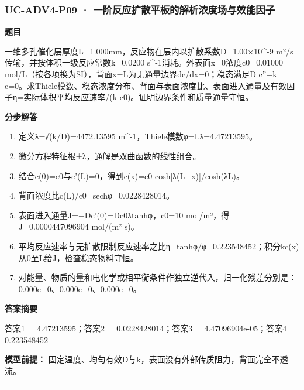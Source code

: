 \documentclass[UTF8,11pt,a4paper]{ctexart}
\begin{document}
\subsubsection*{UC-ADV4-P09 · 一阶反应扩散平板的解析浓度场与效能因子}
\noindent\textbf{题目}\par
一维多孔催化层厚度L=1.000mm，反应物在层内以扩散系数D=1.00×10\textasciicircum{}-9 m²/s传输，并按体积一级反应常数k=0.0200 s\textasciicircum{}-1消耗。外表面x=0浓度c0=0.01000 mol/L（按各项换为SI），背面x=L为无通量边界dc/dx=0；稳态满足D c''−k c=0。求Thiele模数、稳态浓度分布、背面与表面浓度比、表面进入通量及有效因子η=实际体积平均反应速率/(k c0)。证明边界条件和质量通量守恒。\par
\medskip\noindent\textbf{分步解答}
\begin{enumerate}
\item 定义λ=√(k/D)=4472.13595 m\textasciicircum{}-1，Thiele模数φ=Lλ=4.47213595。
\item 微分方程特征根±λ，通解是双曲函数的线性组合。
\item 结合c(0)=c0与c'(L)=0，得到c(x)=c0 cosh[λ(L−x)]/cosh(λL)。
\item 背面浓度比c(L)/c0=sechφ=0.0228428014。
\item 表面进入通量J=−Dc'(0)=Dc0λtanhφ，c0=10 mol/m³，得J=0.0000447096904 mol/(m² s)。
\item 平均反应速率与无扩散限制反应速率之比η=tanhφ/φ=0.223548452；积分kc(x)从0至L给J，检查稳态物料守恒。
\item 对能量、物质的量和电化学或相平衡条件作独立逆代入，归一化残差分别是：0.000e+0、0.000e+0、0.000e+0。
\end{enumerate}
\noindent\textbf{答案摘要}\par
答案1 = 4.47213595；答案2 = 0.0228428014；答案3 = 4.47096904e-05；答案4 = 0.223548452\par
\noindent\textbf{模型前提：}
固定温度、均匀有效D与k，表面没有外部传质阻力，背面完全不透流。\par
\medskip\hrule\medskip
{}
\end{document}

